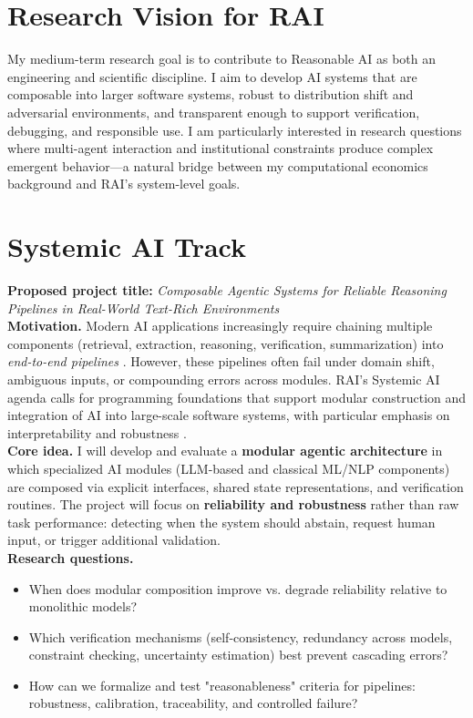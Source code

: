 \documentclass{nfr}
\begin{document}
\section*{Research Vision for RAI}

My medium-term research goal is to contribute to Reasonable AI as both an engineering and scientific discipline. I aim to develop AI systems that are composable into larger software systems, robust to distribution shift and adversarial environments, and transparent enough to support verification, debugging, and responsible use. I am particularly interested in research questions where multi-agent interaction and institutional constraints produce complex emergent behavior---a natural bridge between my computational economics background and RAI's system-level goals.

\section*{Systemic AI Track}

\textbf{Proposed project title:} \textit{Composable Agentic Systems for Reliable Reasoning Pipelines in Real-World Text-Rich Environments} \\

\noindent
\textbf{Motivation.} Modern AI applications increasingly require chaining multiple components (retrieval, extraction, reasoning, verification, summarization) into \emph{end-to-end pipelines} \citep{lewis2020retrieval, yao2022react}. However, these pipelines often fail under domain shift, ambiguous inputs, or compounding errors across modules. RAI's Systemic AI agenda calls for programming foundations that support modular construction and integration of AI into large-scale software systems, with particular emphasis on interpretability and robustness \citep{doshi2017towards}.\\

\noindent
\textbf{Core idea.} I will develop and evaluate a \textbf{modular agentic architecture} in which specialized AI modules (LLM-based and classical ML/NLP components) are composed via explicit interfaces, shared state representations, and verification routines. The project will focus on \textbf{reliability and robustness} rather than raw task performance: detecting when the system should abstain, request human input, or trigger additional validation.\\

\noindent
\textbf{Research questions.}
\begin{itemize}
    \item When does modular composition improve vs. degrade reliability relative to monolithic models?
    \item Which verification mechanisms (self-consistency, redundancy across models, constraint checking, uncertainty estimation) best prevent cascading errors?
    \item How can we formalize and test "reasonableness" criteria for pipelines: robustness, calibration, traceability, and controlled failure?
\end{itemize}
\end{document}
